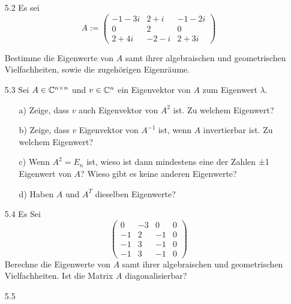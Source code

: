 \documentclass{HM}
\begin{document}
	\begin{enumerate}
	\item[5.2] Es sei
	$$A:=\begin{pmatrix}
		-1-3i&2+i&-1-2i\\
		0&2&0\\
		2+4i&-2-i&2+3i
	\end{pmatrix}$$

Bestimme die Eigenwerte von $A$ samt ihrer algebraischen und geometrischen Vielfachheiten,
sowie die zugehörigen Eigenräume.\\
	
	\item[5.3] Sei $A \in \mathbb{C}^{n\times n}$ und $v \in \mathbb{C}^n$ ein Eigenvektor von $A$ zum Eigenwert $\lambda$.
	\begin{enumerate}
		\item[a)] Zeige, dass $v$ auch Eigenvektor von $A^2$ ist. Zu welchem Eigenwert?\\
		\item[b)] Zeige, dass $v$ Eigenvektor von $A^{-1}$ ist, wenn $A$ invertierbar ist. Zu welchem Eigenwert?\\
		\item[c)] Wenn $A^2 = E_n$ ist, wieso ist dann mindestens eine der Zahlen ±1 Eigenwert von $A$?
		Wieso gibt es keine anderen Eigenwerte?\\
		\item[d)] Haben $A$ und $A^T$ dieselben Eigenwerte?\\
		
	\end{enumerate}

	\item[5.4] Es Sei
	$$\begin{pmatrix}
		0&-3&0&0\\
		-1&2&-1&0\\
		-1&3&-1&0\\
		-1&3&-1&0
	\end{pmatrix}$$
Berechne die Eigenwerte von $A$ samt ihrer algebraischen und geometrischen Vielfachheiten.
Ist die Matrix $A$ diagonalisierbar?\\
	
	\item[5.5]
	\end{enumerate}
\end{document}
